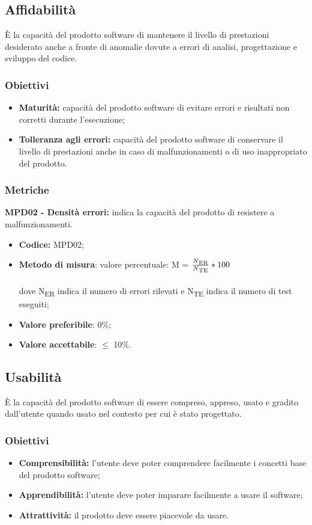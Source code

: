 \subsection{Affidabilità}
È la capacità del prodotto software di mantenere il livello di prestazioni
desiderato anche a fronte di anomalie dovute a errori di analisi, progettazione e sviluppo del codice.
\subsubsection{Obiettivi}
\begin{itemize}
    \item \textbf{Maturità:} capacità del prodotto software di evitare errori e risultati non corretti durante l’esecuzione;
    \item \textbf{Tolleranza agli errori:} capacità del prodotto software di conservare il livello di prestazioni 
    anche in caso di malfunzionamenti o di uso inappropriato del prodotto.
\end{itemize}
\subsubsection{Metriche}
\textbf{MPD02 - Densità errori:} indica la capacità del prodotto di resistere a malfunzionamenti.
\begin{itemize}
    \item \textbf{Codice:} MPD02;
    \item \textbf{Metodo di misura}: valore percentuale: M = $\frac{N\textsubscript{ER}}{N\textsubscript{TE}}*100$ \\
    \\dove N\textsubscript{ER} indica il numero di errori rilevati e N\textsubscript{TE} indica il numero di test eseguiti;
    \item \textbf{Valore preferibile}: 0\%;
    \item \textbf{Valore accettabile}: $\leq$ 10\%.
\end{itemize}
\subsection{Usabilità}
È la capacità del prodotto software di essere compreso, appreso, usato e gradito dall’utente quando usato nel contesto per cui è stato progettato.
\subsubsection{Obiettivi}
\begin{itemize}
    \item \textbf{Comprensibilità:} l'utente deve poter comprendere facilmente i concetti base del prodotto software;
    \item \textbf{Apprendibilità:} l'utente deve poter imparare facilmente a usare il software;
    \item \textbf{Attrattività:} il prodotto deve essere piacevole da usare.
\end{itemize}
